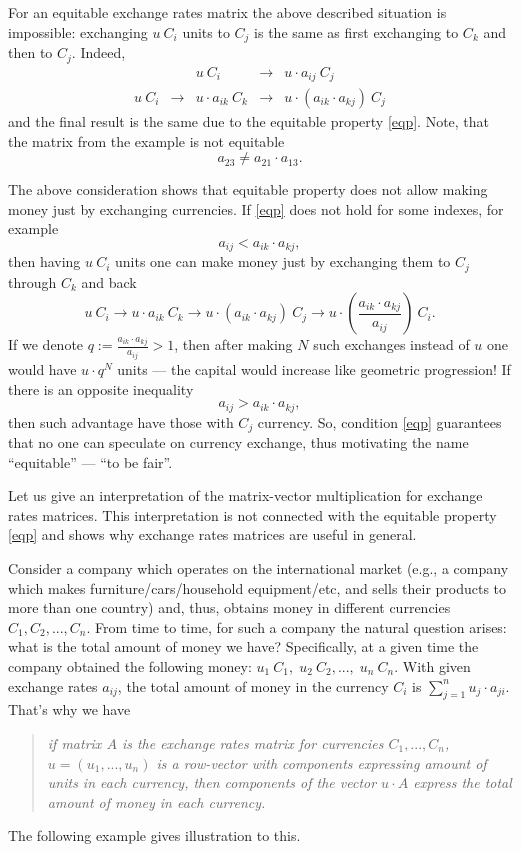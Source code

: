\documentclass[12pt]{article}
\theoremstyle{definition}
\begin{document}
For an equitable exchange rates matrix the above described situation is impossible:
exchanging $u\ C_i$ units to $C_j$ is the same as first exchanging to $C_k$ and then
to $C_j$. Indeed,
$$
\begin{array}{ccccc}
    & & u\ C_i & \longrightarrow & u\cdot a_{ij}\ C_j \\
    u\ C_i & \longrightarrow & u\cdot a_{ik}\ C_k & \longrightarrow & u\cdot(a_{ik}\cdot a_{kj})\ C_j
\end{array}
$$
and the final result is the same due to the equitable property \eqref{eqp}. Note, that the matrix
from the example is not equitable
$$
    a_{23}\neq a_{21}\cdot a_{13}.
$$

The above consideration shows that equitable property does not allow making money
just by exchanging currencies. If \eqref{eqp} does not hold for some
indexes, for example
$$
    a_{ij} < a_{ik}\cdot a_{kj},
$$
then having $u\ C_i$ units one can make money just by exchanging them to $C_j$
through $C_k$ and back
$$
    u\ C_i \longrightarrow u\cdot a_{ik}\ C_k \longrightarrow u\cdot(a_{ik}\cdot a_{kj})\ C_j
           \longrightarrow u\cdot\left( \frac{a_{ik}\cdot a_{kj}}{a_{ij}} \right)\ C_i.
$$
If we denote $q:=\frac{a_{ik}\cdot a_{kj}}{a_{ij}}>1$, then after making $N$ such
exchanges instead of $u$ one would have $u\cdot q^N$ units --- the capital would
increase like geometric progression! If there is an opposite inequality
$$
    a_{ij} > a_{ik}\cdot a_{kj},
$$
then such advantage have those with $C_j$ currency. So, condition \eqref{eqp} guarantees
that no one can speculate on currency exchange, thus motivating the name
``equitable'' --- ``to be fair''.

Let us give an interpretation of the matrix-vector multiplication for exchange rates matrices.
This interpretation is not connected with the equitable property \eqref{eqp} and shows
why exchange rates matrices are useful in general.

Consider a company which operates on the international market (e.g., a company which makes
furniture/cars/household equipment/etc, and sells their products to more than one country) and, thus, obtains
money in different currencies $C_1,C_2,...,C_n$. From time to time,
for such a company the natural question arises: what is the
total amount of money we have? Specifically, at a given time the company obtained
the following money: $u_1\ C_1,\; u_2\ C_2,...,\; u_n\ C_n$. With given exchange rates
$a_{ij}$, the total amount of money in the currency $C_i$ is
$\sum_{j=1}^n  u_j\cdot a_{ji}$.
That's why we have
\begin{quote}
    \textit{if matrix $A$ is the exchange rates matrix for currencies $C_1,...,C_n$,
    $u=(u_1,...,u_n)$ is a row-vector with components expressing amount of units in each currency,
    then components of the vector $u\cdot A$ express the total amount of money in each currency.}
\end{quote}
The following example gives illustration to this.
\end{document}
